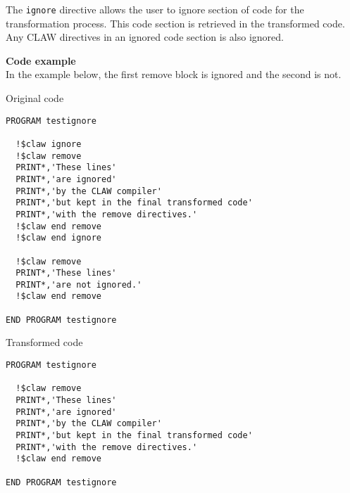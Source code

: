 The \lstinline!ignore! directive allows the user to ignore section of code
for the transformation process. This code section is retrieved in the 
transformed code. Any CLAW directives in an ignored code section is also
ignored.

\textbf{Code example}\\
\label{ignore1}
In the example below, the first remove block is ignored and the second is not.

Original code
\begin{lstlisting}
PROGRAM testignore

  !$claw ignore
  !$claw remove
  PRINT*,'These lines'
  PRINT*,'are ignored'
  PRINT*,'by the CLAW compiler'
  PRINT*,'but kept in the final transformed code'
  PRINT*,'with the remove directives.'
  !$claw end remove
  !$claw end ignore

  !$claw remove
  PRINT*,'These lines'
  PRINT*,'are not ignored.'
  !$claw end remove

END PROGRAM testignore
\end{lstlisting}

Transformed code
\begin{lstlisting}
PROGRAM testignore

  !$claw remove
  PRINT*,'These lines'
  PRINT*,'are ignored'
  PRINT*,'by the CLAW compiler'
  PRINT*,'but kept in the final transformed code'
  PRINT*,'with the remove directives.'
  !$claw end remove

END PROGRAM testignore
\end{lstlisting}
